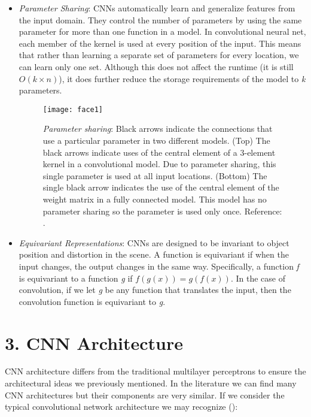 \documentclass[12pt,a4paper,authoryear]{elsarticle}
\begin{document}
\begin{itemize}
		\item \textit{Parameter Sharing}: CNNs automatically learn and generalize features from the input domain. They control the number of parameters by using the same parameter for more than one function in a model. In convolutional neural net, each member of the kernel is used at every position of the input. This means that rather than learning a separate set of parameters for every location, we can learn only one set. Although this does not affect the runtime (it is still $O(k\times n)$), it does further reduce the storage requirements of the model to \textit{k} parameters. 
		
		\begin{figure}[H]
			\begin{center}
				\texttt{[image: face1]}
				\caption{\textit{Parameter sharing}: Black arrows indicate the connections that use a particular parameter in two different models. (Top) The black arrows indicate uses of the central element of a 3-element kernel in a convolutional model. Due to parameter sharing, this single parameter is used at all input locations. (Bottom) The single black arrow indicates the use of the central element of the weight matrix in a fully connected model. This model has no parameter sharing so the parameter is used only once. Reference: \cite{goodfellow2016deep}.}
			\end{center}
		\end{figure}
		
		\item \textit{Equivariant Representations}: CNNs are designed to be invariant to object position and distortion in the scene. A function is equivariant if when the input changes, the output changes in the same way. Specifically, a function \textit{f} is equivariant to a function \textit{g} if $f(g(x))=g(f(x))$. In the case of convolution, if we let \textit{g} be any function that translates the input, then the convolution function is equivariant to \textit{g}.
	\end{itemize}

\section*{3.  CNN Architecture}

	 CNN architecture differs from the traditional multilayer perceptrons to ensure the architectural ideas we previously mentioned. In the literature we can find many CNN architectures but their components are very similar. If we consider the typical convolutional network architecture we may recognize (\cite{bhandare2016applications}):
	 
\end{document}
